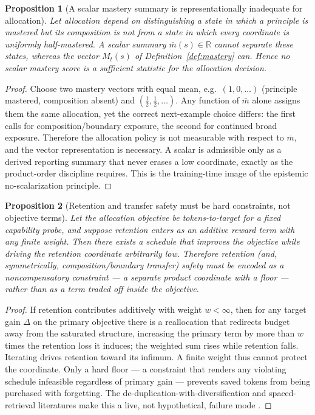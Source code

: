 \documentclass[11pt]{article}
\newtheorem{proposition}{Proposition}
\begin{document}
\begin{proposition}[A scalar mastery summary is representationally inadequate for allocation]
\label{prop:scalar}
Let allocation depend on distinguishing a state in which a principle is mastered but its composition is not from a state in which every coordinate is uniformly half-mastered. A scalar summary $\bar m(s)\in\mathbb{R}$ cannot separate these states, whereas the vector $M_t(s)$ of Definition~\ref{def:mastery} can. Hence no scalar mastery score is a sufficient statistic for the allocation decision.
\end{proposition}
\begin{proof}
Choose two mastery vectors with equal mean, e.g.\ $(1,0,\ldots)$ (principle mastered, composition absent) and $(\tfrac12,\tfrac12,\ldots)$. Any function of $\bar m$ alone assigns them the same allocation, yet the correct next-example choice differs: the first calls for composition/boundary exposure, the second for continued broad exposure. Therefore the allocation policy is not measurable with respect to $\bar m$, and the vector representation is necessary. A scalar is admissible only as a derived reporting summary that never erases a low coordinate, exactly as the product-order discipline requires. This is the training-time image of the epistemic no-scalarization principle.
\end{proof}

\begin{proposition}[Retention and transfer safety must be hard constraints, not objective terms]
\label{prop:retention}
Let the allocation objective be tokens-to-target for a fixed capability probe, and suppose retention enters as an additive reward term with any finite weight. Then there exists a schedule that improves the objective while driving the retention coordinate arbitrarily low. Therefore retention (and, symmetrically, composition/boundary transfer) safety must be encoded as a noncompensatory constraint --- a separate product coordinate with a floor --- rather than as a term traded off inside the objective.
\end{proposition}
\begin{proof}
If retention contributes additively with weight $w<\infty$, then for any target gain $\Delta$ on the primary objective there is a reallocation that redirects budget away from the saturated structure, increasing the primary term by more than $w$ times the retention loss it induces; the weighted sum rises while retention falls. Iterating drives retention toward its infimum. A finite weight thus cannot protect the coordinate. Only a hard floor --- a constraint that renders any violating schedule infeasible regardless of primary gain --- prevents saved tokens from being purchased with forgetting. The de-duplication-with-diversification and spaced-retrieval literatures make this a live, not hypothetical, failure mode \cite{tirumala2023d4,butler2010}.
\end{proof}
\end{document}
